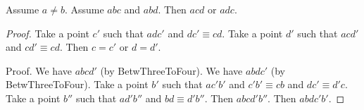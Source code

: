 \documentclass[10pt,a4paper,parskip=half,numbers=endperiod,headings=standardclasses,parskip]{scrbook}
\newcommand{\Cong}[4]{#1 #2 \equiv #3 #4}
\newcommand{\Betw}[3]{#1 #2 #3}
\newcommand{\Col}[3]{\operatorname{Col}(#1, #2, #3)}
\newcommand{\BetwFour}[4]{#1 #2 #3 #4}
\newcommand{\BetwFive}[5]{#1 #2 #3 #4 #5}
\newcommand{\bprime}{b'}
\newcommand{\cprime}{c'}
\def\dprime{d'}
\newcommand{\bdoubleprime}{b''}
\newcommand{\OFS}[8]{\operatorname{OFS}%
\left(
\begin{smallmatrix}%
#1 & #2 & #3 & #4 \\
#5 & #6 & #7 & #8
\end{smallmatrix}%
\right)%
}
\newcommand{\IFS}[8]{\operatorname{IFS}
\left(
\begin{smallmatrix}%
#1 & #2 & #3 & #4 \\
#5 & #6 & #7 & #8
\end{smallmatrix}
\right)%
}
\begin{document}
  \begin{forthel}

    \begin{lemma}[Gupta] %
      Assume $a \neq b$.
      Assume $\Betw{a}{b}{c}$ and $\Betw{a}{b}{d}$.
      Then $\Betw{a}{c}{d}$ or $\Betw{a}{d}{c}$.
    \end{lemma}

    \begin{proof}
      Take a point $\cprime$ such that
        $\Betw{a}{d}{\cprime}$ and $\Cong{d}{\cprime}{c}{d}$.
      Take a point $\dprime$ such that
        $\Betw{a}{c}{\dprime}$ and $\Cong{c}{\dprime}{c}{d}$.
      Then $c = \cprime$ or $d = \dprime$.

      Proof.
        We have $\BetwFour{a}{b}{c}{\dprime}$ (by BetwThreeToFour).
        We have $\BetwFour{a}{b}{d}{\cprime}$ (by BetwThreeToFour).
        Take a point $\bprime$ such that
          $\Betw{a}{\cprime}{\bprime}$ and
          $\Cong{\cprime}{\bprime}{c}{b}$ and
          $\Cong{d}{\cprime}{\dprime}{c}$.
        Take a point $\bdoubleprime$ such that
          $\Betw{a}{\dprime}{\bdoubleprime}$ and
          $\Cong{b}{d}{\dprime}{\bdoubleprime}$.
        Then $\BetwFive{a}{b}{c}{\dprime}{\bdoubleprime}$.
        Then $\BetwFive{a}{b}{d}{\cprime}{\bprime}$.


\end{proof}
\end{forthel}
\end{document}
